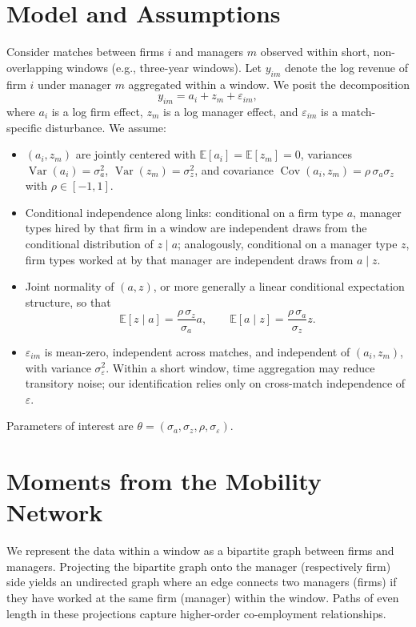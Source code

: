 \documentclass[11pt]{article}
\begin{document}
\section{Model and Assumptions}
\label{sec:model}
Consider matches between firms $i$ and managers $m$ observed within short, non-overlapping windows (e.g., three-year windows). Let $y_{im}$ denote the log revenue of firm $i$ under manager $m$ aggregated within a window. We posit the decomposition
\begin{equation}
\label{eq:model}
 y_{im} = a_i + z_m + \varepsilon_{im},
\end{equation}
where $a_i$ is a log firm effect, $z_m$ is a log manager effect, and $\varepsilon_{im}$ is a match-specific disturbance. We assume:
\begin{itemize}
  \item $(a_i, z_m)$ are jointly centered with $\mathbb{E}[a_i]=\mathbb{E}[z_m]=0$, variances $\operatorname{Var}(a_i)=\sigma_a^2$, $\operatorname{Var}(z_m)=\sigma_z^2$, and covariance $\operatorname{Cov}(a_i,z_m)=\rho\,\sigma_a\sigma_z$ with $\rho\in[-1,1]$.
  \item Conditional independence along links: conditional on a firm type $a$, manager types hired by that firm in a window are independent draws from the conditional distribution of $z\mid a$; analogously, conditional on a manager type $z$, firm types worked at by that manager are independent draws from $a\mid z$.
  \item Joint normality of $(a,z)$, or more generally a linear conditional expectation structure, so that
  \begin{equation}
   \mathbb{E}[z\mid a] = \frac{\rho\,\sigma_z}{\sigma_a}a,\qquad \mathbb{E}[a\mid z] = \frac{\rho\,\sigma_a}{\sigma_z}z.
  \end{equation}
  \item $\varepsilon_{im}$ is mean-zero, independent across matches, and independent of $(a_i, z_m)$, with variance $\sigma_\varepsilon^2$. Within a short window, time aggregation may reduce transitory noise; our identification relies only on cross-match independence of $\varepsilon$.
\end{itemize}
Parameters of interest are $\theta=(\sigma_a,\sigma_z,\rho,\sigma_\varepsilon)$.

\section{Moments from the Mobility Network}
We represent the data within a window as a bipartite graph between firms and managers. Projecting the bipartite graph onto the manager (respectively firm) side yields an undirected graph where an edge connects two managers (firms) if they have worked at the same firm (manager) within the window. Paths of even length in these projections capture higher-order co-employment relationships.
\end{document}
